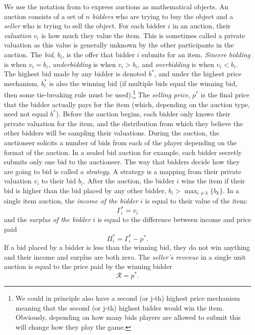 \documentclass[12pt,twoside]{reedthesis}
\begin{document}
We use the notation from \cite{Mochon2015} to express auctions as mathematical objects. An auction consists of a set of $n$ {\em bidders} who are trying to buy the object and a {\em seller} who is trying to sell the object.  For each bidder $i$ in an auction, their {\em  valuation} $v_i$ is how much they value the item. This is sometimes called a private valuation as this value is generally unknown by the other participants in the auction. The \textit{bid}, $b_i$, is the offer that bidder $i$ submits for an item. {\em Sincere bidding} is when $v_i = b_i$, {\em underbidding} is when $v_i > b_i$, and {\em overbidding} is when $v_i < b_i$. The highest bid made by any bidder is denoted $b^*$, and under the highest price mechanism, $b^*_i$ is also the winning bid (if multiple bids equal the winning bid, then some tie-breaking rule must be used).\footnote{We could in principle also have a second (or j-th) highest price mechanism meaning that the second (or j-th) highest bidder would win the item. Obviously, depending on how many bids players are allowed to submit this will change how they play the game.} The \textit{selling price}, $p^*$ is the final price that the bidder actually pays for the item (which, depending on the auction type, need not equal $b^*$). Before the auction begins, each bidder only knows their private valuation for the item, and the distribution from which they believe the other bidders will be sampling their valuations. During the auction, the auctioneer solicits a number of bids from each of the player depending on the format of the auction. In a sealed bid auction for example, each bidder secretly submits only one bid to the auctioneer. The way that bidders decide how they are going to bid is called a {\em strategy}. A strategy is a mapping from their private valuation $v_i$ to their bid $b_i$. After the auction, the bidder $i$ wins the item if their bid is higher than the bid placed by any other bidder, $b_i > \max_{i \neq k} \{b_k\}$. In a single item auction, the {\em income of the bidder} $i$ is equal to their value of the item: $$ \Gamma_i^* = v_i$$ and the {\em surplus of the bidder} $i$ is equal to the difference between income and price paid $$ \Pi_i^* = \Gamma_i^* - p^*.$$ If a bid placed by a bidder is less than the winning bid, they do not win anything and their income and surplus are both zero. The {\em seller's revenue} in a single unit auction is equal to the price paid by the winning bidder $$ \mathcal{R} = p^*.$$ 
\end{document}
